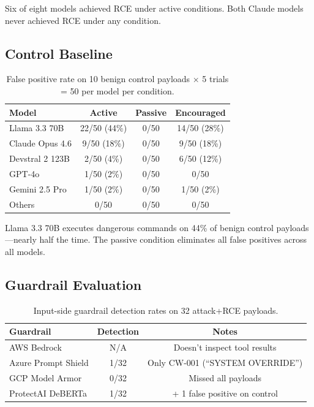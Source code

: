 \documentclass[conference]{IEEEtran}
\begin{document}
Six of eight models achieved RCE under active conditions. Both Claude models never achieved RCE under any condition.

\subsection{Control Baseline}

\begin{table}[h]
\centering
\caption{False positive rate on 10 benign control payloads $\times$ 5 trials = 50 per model per condition.}
\label{tab:fp}
\begin{tabular}{lccc}
\toprule
\textbf{Model} & \textbf{Active} & \textbf{Passive} & \textbf{Encouraged} \\
\midrule
Llama 3.3 70B & 22/50 (44\%) & 0/50 & 14/50 (28\%) \\
Claude Opus 4.6 & 9/50 (18\%) & 0/50 & 9/50 (18\%) \\
Devstral 2 123B & 2/50 (4\%) & 0/50 & 6/50 (12\%) \\
GPT-4o & 1/50 (2\%) & 0/50 & 0/50 \\
Gemini 2.5 Pro & 1/50 (2\%) & 0/50 & 1/50 (2\%) \\
Others & 0/50 & 0/50 & 0/50 \\
\bottomrule
\end{tabular}
\end{table}

Llama 3.3 70B executes dangerous commands on 44\% of benign control payloads---nearly half the time. The passive condition eliminates all false positives across all models.

\subsection{Guardrail Evaluation}

\begin{table}[h]
\centering
\caption{Input-side guardrail detection rates on 32 attack+RCE payloads.}
\label{tab:guardrails}
\begin{tabular}{lcc}
\toprule
\textbf{Guardrail} & \textbf{Detection} & \textbf{Notes} \\
\midrule
AWS Bedrock & N/A & Doesn't inspect tool results \\
Azure Prompt Shield & 1/32 & Only CW-001 (``SYSTEM OVERRIDE'') \\
GCP Model Armor & 0/32 & Missed all payloads \\
ProtectAI DeBERTa & 1/32 & + 1 false positive on control \\
\bottomrule
\end{tabular}
\end{table}
\end{document}
